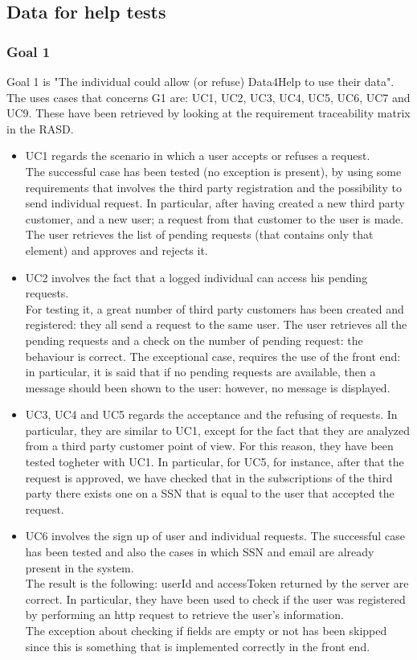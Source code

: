 \subsection{Data for help tests}
\subsubsection{Goal 1}
Goal 1 is "The individual could allow (or refuse) Data4Help to use their data".
The uses cases that concerns G1 are: UC1, UC2, UC3, UC4, UC5, UC6, UC7 and UC9. These have been retrieved by looking
at the requirement traceability matrix in the RASD.  

\begin{itemize}
\item 
UC1 regards the scenario in which a user accepts or refuses a request. \\
The successful case has been tested (no exception is present), by using some requirements that involves the
third party registration and the possibility to send individual request. In particular, after having created a new third party customer,
and a new user; a request from that customer to the user is made. The user retrieves the list of pending requests (that contains only that
element) and approves and rejects it.

\item 
UC2 involves the fact that a logged individual can access his pending requests. \\
For testing it, a great number of third party customers has been created and registered: they all send a request to the same user.
The user retrieves all the pending requests and a check on the number of pending request: the behaviour is correct.
The exceptional case, requires the use of the front end: in particular, it is said that if no pending requests are available, then a message
should been shown to the user: however, no message is displayed.

\item 
UC3, UC4 and UC5 regards the acceptance and the refusing of requests. In particular, they are similar to UC1, except for the fact
that they are analyzed from a third party customer point of view. For this reason, they have been tested togheter with UC1. 
In particular, for UC5, for instance, after that the request is approved, we have checked that in the subscriptions
of the third party there exists one on a SSN that is equal to the user that accepted the request.

\item UC6 involves the sign up of user and individual requests. The successful case has been tested and also the cases in which SSN and email
are already present in the system. \\
The result is the following: userId and accessToken returned by the server are correct. In particular, they have been used to check
if the user was registered by performing an http request to retrieve the user's information.  \\
The exception about checking if fields are empty or not has been skipped since this is something that is implemented correctly in the front
end.


\end{itemize}
